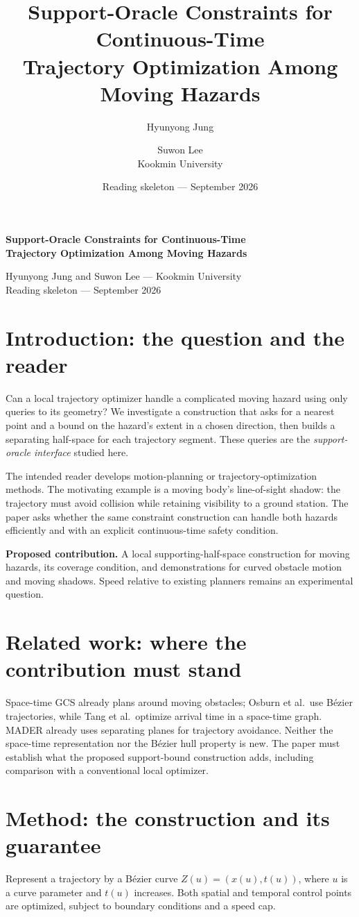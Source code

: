 \documentclass[11pt]{article}
\title{Support-Oracle Constraints for Continuous-Time\\
Trajectory Optimization Among Moving Hazards}
\author{Hyunyong Jung \and Suwon Lee\\Kookmin University}
\date{Reading skeleton --- September 2026}
\begin{document}
\begin{center}
{\Large\bfseries Support-Oracle Constraints for Continuous-Time\\[2pt]
Trajectory Optimization Among Moving Hazards\par}
\medskip
Hyunyong Jung and Suwon Lee --- Kookmin University\\
{\small Reading skeleton --- September 2026}
\end{center}

\section{Introduction: the question and the reader}
Can a local trajectory optimizer handle a complicated moving hazard using only
queries to its geometry? We investigate a construction that asks for a nearest
point and a bound on the hazard's extent in a chosen direction, then builds a
separating half-space for each trajectory segment. These queries are the
\emph{support-oracle interface} studied here.

The intended reader develops motion-planning or trajectory-optimization methods.
The motivating example is a moving body's line-of-sight shadow: the trajectory
must avoid collision while retaining visibility to a ground station. The paper
asks whether the same constraint construction can handle both hazards efficiently
and with an explicit continuous-time safety condition.

\textbf{Proposed contribution.} A local supporting-half-space construction for
moving hazards, its coverage condition, and demonstrations for curved obstacle
motion and moving shadows. Speed relative to existing planners remains an
experimental question.

\section{Related work: where the contribution must stand}
Space-time GCS already plans around moving obstacles; Osburn et al.\ use
B\'ezier trajectories, while Tang et al.\ optimize arrival time in a space-time
graph. MADER already uses separating planes for trajectory avoidance.
Neither the space-time representation nor the B\'ezier hull property is new.
The paper must establish what the proposed support-bound construction adds,
including comparison with a conventional local optimizer.

\section{Method: the construction and its guarantee}
Represent a trajectory by a B\'ezier curve $Z(u)=(x(u),t(u))$, where $u$ is a
curve parameter and $t(u)$ increases. Both spatial and temporal control points
are optimized, subject to boundary conditions and a speed cap.
\end{document}

